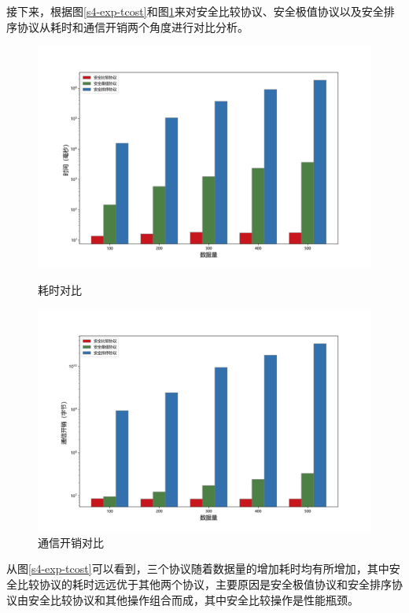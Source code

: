 接下来，根据图\ref{s4-exp-tcost}和图\ref{s4-exp-ccost}来对安全比较协议、安全极值协议以及安全排序协议从耗时和通信开销两个角度进行对比分析。
\begin{figure}[htbp] %
	\begin{minipage}[t]{0.5\linewidth}
		\includegraphics[width=\linewidth]{img/timecompare.png}
		\caption{耗时对比}
		\label{s4-exp-tcost}
	\end{minipage}%
	\hfill%
	\begin{minipage}[t]{0.5\linewidth}
		\includegraphics[width=\linewidth]{img/commcompare.png}
		\caption{通信开销对比}
		\label{s4-exp-ccost}
	\end{minipage}
\end{figure}

从图\ref{s4-exp-tcost}可以看到，三个协议随着数据量的增加耗时均有所增加，其中安全比较协议的耗时远远优于其他两个协议，主要原因是安全极值协议和安全排序协议由安全比较协议和其他操作组合而成，其中安全比较操作是性能瓶颈。

